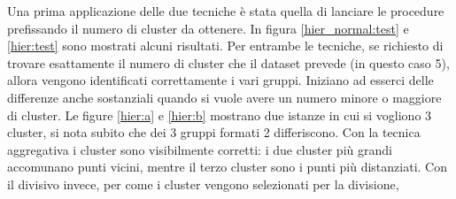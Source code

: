 \documentclass{llncs}
\begin{document}
	Una prima applicazione delle due tecniche è stata quella di lanciare le procedure prefissando il numero di cluster da ottenere. In figura \ref{hier_normal:test} e \ref{hier:test} sono mostrati alcuni risultati.
	Per entrambe le tecniche, se richiesto di trovare esattamente il numero di cluster che il dataset prevede (in questo caso 5), allora vengono identificati correttamente i vari gruppi. 
	Iniziano ad esserci	delle differenze anche sostanziali quando si vuole avere un numero minore o maggiore di cluster. Le figure \ref{hier:a} e \ref{hier:b} mostrano due istanze 
	in cui si vogliono 3 cluster, si nota subito che dei 3 gruppi formati 2 differiscono. Con la tecnica aggregativa i cluster sono visibilmente corretti: i due cluster più grandi accomunano punti vicini,
	mentre il terzo cluster sono i punti più distanziati. Con il divisivo invece, per come i cluster vengono selezionati per la divisione, 
\end{document}
